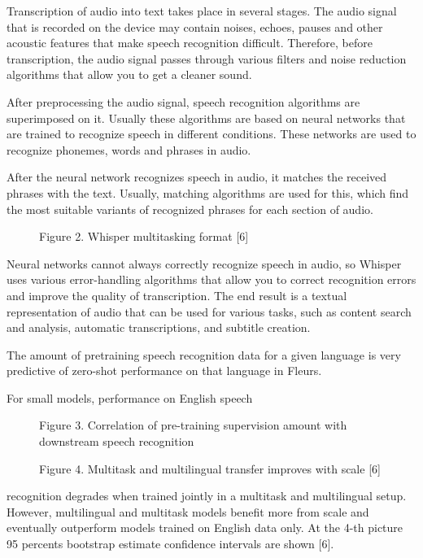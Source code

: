 \documentclass [a4paper, 10pt, twocolumn] {article}
\begin{document}
Transcription of audio into text takes place in several
stages. The audio signal that is recorded on the device may
contain noises, echoes, pauses and other acoustic features
that make speech recognition difficult. Therefore, before
transcription, the audio signal passes through various
filters and noise reduction algorithms that allow you to
get a cleaner sound.

After preprocessing the audio signal, speech recognition algorithms are superimposed on it. Usually these
algorithms are based on neural networks that are trained to
recognize speech in different conditions. These networks
are used to recognize phonemes, words and phrases in
audio.

After the neural network recognizes speech in audio,
it matches the received phrases with the text. Usually,
matching algorithms are used for this, which find the most
suitable variants of recognized phrases for each section
of audio.
\begin{figure}[H]
	\caption*{Figure 2. Whisper multitasking format [6]}
\end{figure}


Neural networks cannot always correctly recognize
speech in audio, so Whisper uses various error-handling
algorithms that allow you to correct recognition errors
and improve the quality of transcription. The end result
is a textual representation of audio that can be used
for various tasks, such as content search and analysis,
automatic transcriptions, and subtitle creation.

The amount of pretraining speech recognition data
for a given language is very predictive of zero-shot
performance on that language in Fleurs.

For small models, performance on English speech
\begin{figure}[H]
	\caption*{Figure 3. Correlation of pre-training supervision amount with downstream speech recognition}
	\caption*{Figure 4. Multitask and multilingual transfer improves with scale [6]}
\end{figure}
recognition degrades when trained jointly in a multitask and multilingual setup. However, multilingual and
multitask models benefit more from scale and eventually
outperform models trained on English data only. At the
4-th picture 95 percents bootstrap estimate confidence
intervals are shown [6].
\end{document}
